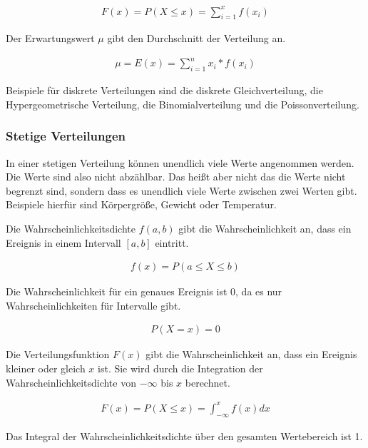\documentclass[12pt]{scrartcl}
\begin{document}
\begin{align*}
    F(x) = P(X \leq x) = \sum_{i=1}^{x} f(x_i)
\end{align*}

Der Erwartungswert $\mu$ gibt den Durchschnitt der Verteilung an.\par

\begin{align*}
    \mu = E(x) = \sum_{i=1}^{n} x_i * f(x_i)
\end{align*}

Beispiele für diskrete Verteilungen sind die diskrete Gleichverteilung, die Hypergeometrische Verteilung, die Binomialverteilung und die Poissonverteilung.

\subsubsection{Stetige Verteilungen}

In einer stetigen Verteilung können unendlich viele Werte angenommen werden. Die Werte sind also nicht abzählbar.
Das heißt aber nicht das die Werte nicht begrenzt sind, sondern dass es unendlich viele Werte zwischen zwei Werten gibt.
Beispiele hierfür sind Körpergröße, Gewicht oder Temperatur.\par

Die Wahrscheinlichkeitsdichte $f(a,b)$ gibt die Wahrscheinlichkeit an, dass ein Ereignis in einem Intervall $[a,b]$ eintritt.\par

\begin{align*}
    f(x) = P(a \leq X \leq b)
\end{align*}

Die Wahrscheinlichkeit für ein genaues Ereignis ist 0, da es nur Wahrscheinlichkeiten für Intervalle gibt.\par

\begin{align*}
    P(X=x) = 0
\end{align*}

Die Verteilungsfunktion $F(x)$ gibt die Wahrscheinlichkeit an, dass ein Ereignis kleiner oder gleich $x$ ist.
Sie wird durch die Integration der Wahrscheinlichkeitsdichte von $-\infty$ bis $x$ berechnet.\par

\begin{align*}
    F(x) = P(X \leq x) = \int_{-\infty}^{x} f(x) dx
\end{align*}

Das Integral der Wahrscheinlichkeitsdichte über den gesamten Wertebereich ist 1.\par
\end{document}
